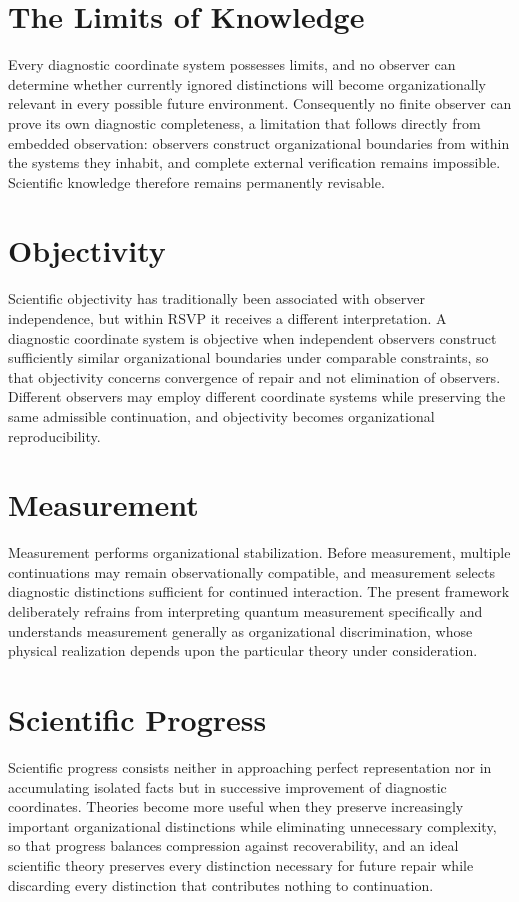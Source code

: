 \documentclass[11pt,oneside]{book}
\numberwithin{equation}{chapter}
\theoremstyle{definition}
\theoremstyle{plain}
\begin{document}
\section{The Limits of Knowledge}

Every diagnostic coordinate system possesses limits, and no observer can determine whether currently ignored distinctions will become organizationally relevant in every possible future environment. Consequently no finite observer can prove its own diagnostic completeness, a limitation that follows directly from embedded observation: observers construct organizational boundaries from within the systems they inhabit, and complete external verification remains impossible. Scientific knowledge therefore remains permanently revisable.

\section{Objectivity}

Scientific objectivity has traditionally been associated with observer independence, but within RSVP it receives a different interpretation. A diagnostic coordinate system is objective when independent observers construct sufficiently similar organizational boundaries under comparable constraints, so that objectivity concerns convergence of repair and not elimination of observers. Different observers may employ different coordinate systems while preserving the same admissible continuation, and objectivity becomes organizational reproducibility.

\section{Measurement}

Measurement performs organizational stabilization. Before measurement, multiple continuations may remain observationally compatible, and measurement selects diagnostic distinctions sufficient for continued interaction. The present framework deliberately refrains from interpreting quantum measurement specifically and understands measurement generally as organizational discrimination, whose physical realization depends upon the particular theory under consideration.

\section{Scientific Progress}

Scientific progress consists neither in approaching perfect representation nor in accumulating isolated facts but in successive improvement of diagnostic coordinates. Theories become more useful when they preserve increasingly important organizational distinctions while eliminating unnecessary complexity, so that progress balances compression against recoverability, and an ideal scientific theory preserves every distinction necessary for future repair while discarding every distinction that contributes nothing to continuation.
\end{document}
